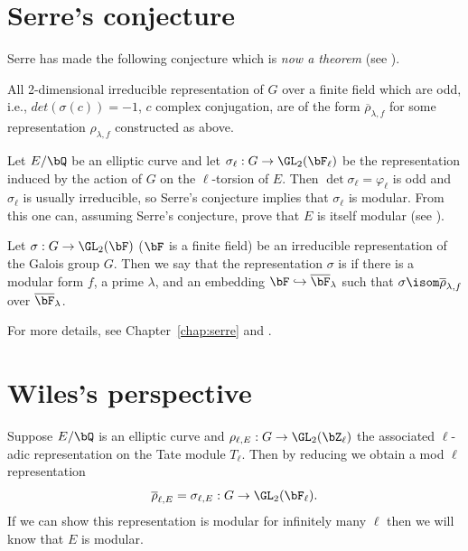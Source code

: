 \documentclass{report}
\begin{document}
\section{Serre's conjecture}
 Serre has made the following conjecture which is {\em
  now a theorem} (see \cite{khare-wintenberger:serre1}).
\begin{conjecture}[Serre]
All 2-dimensional irreducible representation of
$G$ over a finite field which are odd, i.e., $det(\sigma(c))=-1$, $c$
complex conjugation, are of the form $\overline{\rho}_{\lambda,f}$
for some representation $\rho_{\lambda,f}$ constructed as above.
\end{conjecture}

\begin{example}
  Let $E/\bQ$ be an elliptic curve and let
  $\sigma_{\ell}:G\rightarrow\GL_2(\bF_{\ell})$ be the representation
  induced by the action of $G$ on the $\ell$-torsion of $E$. Then
  $\det \sigma_{\ell} = \varphi_{\ell}$ is odd and $\sigma_{\ell}$ is
  usually irreducible, so Serre's conjecture
  implies that $\sigma_{\ell}$ is modular. From this one can, assuming
  Serre's conjecture, prove that $E$ is itself modular (see
  \cite{ribet:abvars}).
\end{example}

\begin{definition}
  Let $\sigma:G\rightarrow \GL_2(\bF)$ ($\bF$ is a finite field) be an
  irreducible representation of the Galois group $G$. Then we say that
  the representation $\sigma$ is  if there is a modular
  form $f$, a prime $\lambda$, and an embedding $\bF\hookrightarrow
  \overline{\bF}_{\lambda}$ such that
  $\sigma\isom\overline{\rho}_{\lambda,f}$ over
  $\overline{\bF}_\lambda$.
\end{definition}

For more details, see Chapter~\ref{chap:serre}
and \cite{ribet-stein:serre}.

\section{Wiles's perspective}

Suppose $E/\bQ$ is an elliptic curve and
$\rho_{\ell,E}:G\rightarrow\GL_2(\bZ_{\ell})$
the associated $\ell$-adic representation on the
Tate module $T_{\ell}$. Then by reducing
we obtain a mod $\ell$ representation
$$\overline{\rho}_{\ell,E}=\sigma_{\ell,E}:G
\rightarrow \GL_2(\bF_{\ell}).$$
If we can show this representation is modular for infinitely many $\ell$
then we will know that $E$ is modular.
\end{document}
